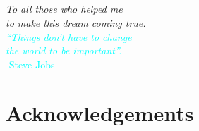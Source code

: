\documentclass[a4paper,11pt,twoside]{ThesisStyle}
\begin{document}

\vspace{3cm}
{}


\section*{}
\vspace{40ex}
\begin{flushright}

\textit{To all those who helped me \\
to make this dream coming true. } \\

\textcolor{cyan}{
\textit{``Things don't have to change \\
the world to be important''. \\}
     -Steve Jobs -
}

\end{flushright}
\cleardoublepage




\chapter*{Acknowledgements}



\end{document}
